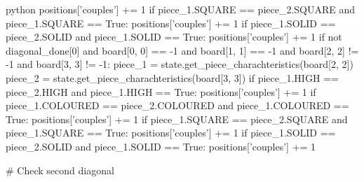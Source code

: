 \begin{mintedbox}{python}
            positions['couples'] += 1
        if piece_1.SQUARE == piece_2.SQUARE and piece_1.SQUARE == True:
            positions['couples'] += 1
        if piece_1.SOLID == piece_2.SOLID and piece_1.SOLID == True:
            positions['couples'] += 1
    if not diagonal_done[0] and board[0, 0] == -1 and board[1, 1] == -1 and board[2, 2] != -1 and board[3, 3] != -1:
        piece_1 = state.get_piece_charachteristics(board[2, 2])
        piece_2 = state.get_piece_charachteristics(board[3, 3])
        if piece_1.HIGH == piece_2.HIGH and piece_1.HIGH == True:
            positions['couples'] += 1
        if piece_1.COLOURED == piece_2.COLOURED and piece_1.COLOURED == True:
            positions['couples'] += 1
        if piece_1.SQUARE == piece_2.SQUARE and piece_1.SQUARE == True:
            positions['couples'] += 1
        if piece_1.SOLID == piece_2.SOLID and piece_1.SOLID == True:
            positions['couples'] += 1

    # Check second diagonal


\end{mintedbox}
